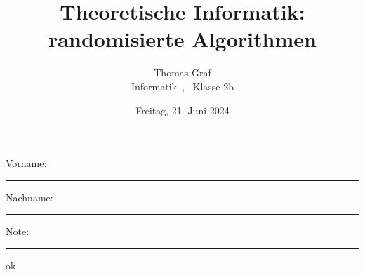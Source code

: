 \newtoggle{withbonus}  %

\newcommand{\mycourse}{\faFirefox~Informatik~\faCodeFork}
\newcommand{\myclass}{\faMortarBoard~Klasse 2b~\faToggleOn}
\newcommand{\mydate}{Freitag, 21. Juni 2024}

\title{\textbf{Theoretische Informatik: randomisierte Algorithmen}}
\author{Thomas Graf\\
\mycourse, \myclass}
\date{\mydate}
\maketitle
\thispagestyle{headandfoot}		

\begin{center}
\end{center}
\vspace{10mm}

\begin{center}
	Vorname: \rule{45mm}{0.8pt}\qquad Nachname: \rule{45mm}{0.8pt}
\end{center}
\vspace{20mm}

\begin{center}
	\iftoggle{withbonus} {
		\combinedgradetable[h][questions]
	} {
		\gradetable[h][questions]
	}
\end{center}
\vspace{15mm}
\begin{center}
	Note: 
	\vspace{10mm}
	
	\rule{8mm}{1.2pt}
\end{center}
\clearpage


\begin{questions}
\question
\begin{parts}
  \part[1]
  \part[1]
\end{parts}
\droptotalpoints

\question[2] ok


\end{questions}


